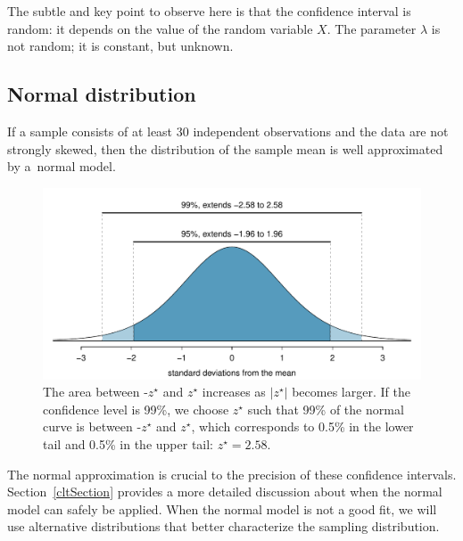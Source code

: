 The subtle and key point to observe here is that the confidence interval is random: it depends on the value of the random variable $X$.
The parameter $\lambda$ is not random; it is constant, but unknown.

\subsection{Normal distribution}
\begin{termBox}{
If a sample consists of at least 30 independent observations and the data are not strongly skewed, then the distribution of the sample mean is well approximated by a~normal model.}
\end{termBox}




\begin{figure}%
\centering
\includegraphics[width=\textwidth]{ch_inference_foundations/figures/choosingZForCI/choosingZForCI}
\caption{The area between -$z^{\star}$ and $z^{\star}$ increases as $|z^{\star}|$ becomes larger. If the confidence level is 99\%, we choose $z^{\star}$ such that 99\% of the normal curve is between -$z^{\star}$ and $z^{\star}$, which corresponds to 0.5\% in the lower tail and 0.5\% in the upper tail: $z^{\star}=2.58$.}
\label{choosingZForCI}
\end{figure}

The normal approximation is crucial to the precision of these confidence intervals. Section~\ref{cltSection} provides a more detailed discussion about when the normal model can safely be applied. When the normal model is not a good fit, we will use alternative distributions that better characterize the sampling distribution.

